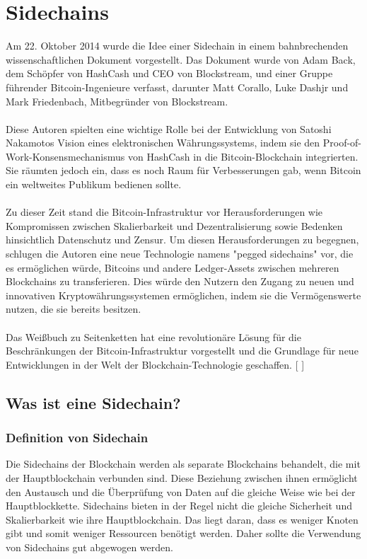 \documentclass[ngerman]{scrreprt}
\begin{document}
\chapter{Sidechains}
Am 22. Oktober 2014 wurde die Idee einer Sidechain in einem bahnbrechenden wissenschaftlichen Dokument vorgestellt. Das Dokument wurde von Adam Back, dem Schöpfer von HashCash und CEO von Blockstream, und einer Gruppe führender Bitcoin-Ingenieure verfasst, darunter Matt Corallo, Luke Dashjr und Mark Friedenbach, Mitbegründer von Blockstream.\\ \\
Diese Autoren spielten eine wichtige Rolle bei der Entwicklung von Satoshi Nakamotos Vision eines elektronischen Währungssystems, indem sie den Proof-of-Work-Konsensmechanismus von HashCash in die Bitcoin-Blockchain integrierten. Sie räumten jedoch ein, dass es noch Raum für Verbesserungen gab, wenn Bitcoin ein weltweites Publikum bedienen sollte. \\ \\
Zu dieser Zeit stand die Bitcoin-Infrastruktur vor Herausforderungen wie Kompromissen zwischen Skalierbarkeit und Dezentralisierung sowie Bedenken hinsichtlich Datenschutz und Zensur. Um diesen Herausforderungen zu begegnen, schlugen die Autoren eine neue Technologie namens "pegged sidechains" vor, die es ermöglichen würde, Bitcoins und andere Ledger-Assets zwischen mehreren Blockchains zu transferieren. Dies würde den Nutzern den Zugang zu neuen und innovativen Kryptowährungssystemen ermöglichen, indem sie die Vermögenswerte nutzen, die sie bereits besitzen.\\ \\
Das Weißbuch zu Seitenketten hat eine revolutionäre Lösung für die Beschränkungen der Bitcoin-Infrastruktur vorgestellt und die Grundlage für neue Entwicklungen in der Welt der Blockchain-Technologie geschaffen. [ \cite{coin_desk} ]
\section{Was ist eine Sidechain?}
\subsection{Definition von Sidechain}
Die Sidechains der Blockchain werden als separate Blockchains behandelt, die mit der Hauptblockchain verbunden sind. Diese Beziehung zwischen ihnen ermöglicht den Austausch und die Überprüfung von Daten auf die gleiche Weise wie bei der Hauptblockkette. Sidechains bieten in der Regel nicht die gleiche Sicherheit und Skalierbarkeit wie ihre Hauptblockchain. Das liegt daran, dass es weniger Knoten gibt und somit weniger Ressourcen benötigt werden. Daher sollte die Verwendung von Sidechains gut abgewogen werden. 
\end{document}
